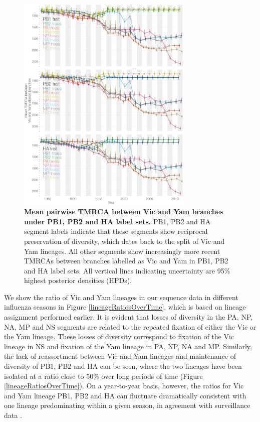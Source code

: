 \documentclass[11pt,oneside,letterpaper]{article}
\begin{document}
\begin{figure}[h]
	\centering		
	\includegraphics[width=0.75\textwidth]{figures/InfB_betweenDiversity.png}
	\caption{\textbf{Mean pairwise TMRCA between Vic and Yam branches under PB1, PB2 and HA label sets.}
PB1, PB2 and HA segment labels indicate that these segments show reciprocal preservation of diversity, which dates back to the split of Vic and Yam lineages.
All other segments show increasingly more recent TMRCAs between branches labelled as Vic and Yam in PB1, PB2 and HA label sets.
All vertical lines indicating uncertainty are 95\% highest posterior densities (HPDs).}
	\label{betweenDiversity}
\end{figure}

We show the ratio of Vic and Yam lineages in our sequence data in different influenza seasons in Figure \ref{lineageRatiosOverTime}, which is based on lineage assignment performed earlier.
It is evident that losses of diversity in the PA, NP, NA, MP and NS segments are related to the repeated fixation of either the Vic or the Yam lineage.
These losses of diversity correspond to fixation of the Vic lineage in NS and fixation of the Yam lineage in PA, NP, NA and MP.
Similarly, the lack of reassortment between Vic and Yam lineages and maintenance of diversity of PB1, PB2 and HA can be seen, where the two lineages have been isolated at a ratio close to 50\% over long periods of time (Figure \ref{lineageRatiosOverTime}).
On a year-to-year basis, however, the ratios for Vic and Yam lineage PB1, PB2 and HA can fluctuate dramatically consistent with one lineage predominating within a given season, in agreement with surveillance data \citep{reed2012}.
\end{document}
